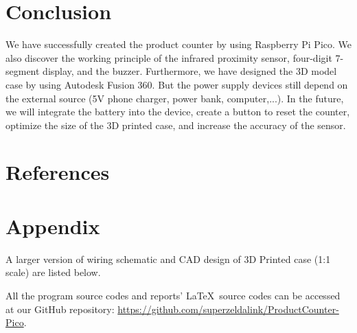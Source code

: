 \documentclass[13pt,a4paper,twoside]{report}
\begin{document}
\chapter{Conclusion}
We have successfully created the product counter by using Raspberry Pi Pico. We also discover the working principle of the infrared proximity sensor, four-digit 7-segment display, and the buzzer. Furthermore, we have designed the 3D model case by using Autodesk Fusion 360. But the power supply devices still depend on the external source (5V phone charger, power bank, computer,...). In the future, we will integrate the battery into the device, create a button to reset the counter, optimize the size of the 3D printed case, and increase the accuracy of the sensor. 

\chapter{References}
\AtNextBibliography{\large}
\setlength\bibitemsep{5pt}
\nocite{*}
\printbibliography[heading=none]

\chapter{Appendix}
A larger version of wiring schematic and CAD design of 3D Printed case (1:1 scale) are listed below.

All the program source codes and reports' \LaTeX \ source codes can be accessed at our GitHub repository: \url{https://github.com/superzeldalink/ProductCounter-Pico}.

\begin{landscape}

\end{landscape}

\end{document}

